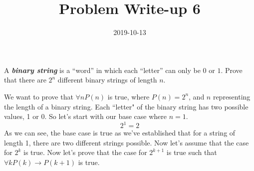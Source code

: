 ﻿\documentclass[a4paper,12pt]{article}
\title{Problem Write-up 6}
\date{2019-10-13}
\begin{document}
    \begin{problem}
        A \textbf{\textit{binary string}} is a “word” in which each “letter” can only be \(0\) or \(1\). Prove that there are \(2^n\) different binary strings of length \(n\).
    \end{problem}
    \begin{answer}
        We want to prove that \(\forall n P(n)\) is true, where \(P(n) = 2^n\), and \(n\) representing the length of a binary string. Each ``letter" of the binary string has two possible values, 1 or 0. So let's start with our base case where \(n = 1\).
	\begin{equation}
	    2^1 = 2
	\end{equation}
	As we can see, the base case is true as we've established that for a string of length 1, there are two different strings possible. Now let's assume that the case for \(2^k\) is true. Now let's prove that the case for \(2^{k + 1}\) is true such that \(\forall k P(k) \rightarrow P(k + 1)\) is true.
    \end{answer}
\end{document}
